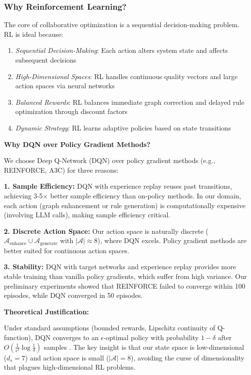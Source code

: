 \documentclass[runningheads]{llncs}
\begin{document}
\subsubsection{Why Reinforcement Learning?}
The core of collaborative optimization is a sequential decision-making problem. RL is ideal because:
\begin{enumerate}
    \item \textit{Sequential Decision-Making}: Each action alters system state and affects subsequent decisions
    \item \textit{High-Dimensional Spaces}: RL handles continuous quality vectors and large action spaces via neural networks
    \item \textit{Balanced Rewards}: RL balances immediate graph correction and delayed rule optimization through discount factors
    \item \textit{Dynamic Strategy}: RL learns adaptive policies based on state transitions
\end{enumerate}

\textbf{Why DQN over Policy Gradient Methods?}

We choose Deep Q-Network (DQN) over policy gradient methods (e.g., REINFORCE, A3C) for three reasons:

\textbf{1. Sample Efficiency:} DQN with experience replay reuses past transitions, achieving 3-5× better sample efficiency than on-policy methods. In our domain, each action (graph enhancement or rule generation) is computationally expensive (involving LLM calls), making sample efficiency critical.

\textbf{2. Discrete Action Space:} Our action space is naturally discrete ($\mathcal{A}_{\text{enhance}} \cup \mathcal{A}_{\text{generate}}$ with $|\mathcal{A}| \approx 8$), where DQN excels. Policy gradient methods are better suited for continuous action spaces.

\textbf{3. Stability:} DQN with target networks and experience replay provides more stable training than vanilla policy gradients, which suffer from high variance. Our preliminary experiments showed that REINFORCE failed to converge within 100 episodes, while DQN converged in 50 episodes.

\textbf{Theoretical Justification:}

Under standard assumptions (bounded rewards, Lipschitz continuity of Q-function), DQN converges to an $\epsilon$-optimal policy with probability $1-\delta$ after $O(\frac{1}{\epsilon^2} \log \frac{1}{\delta})$ samples \cite{ref_mnih2015}. The key insight is that our state space is low-dimensional ($d_s = 7$) and action space is small ($|\mathcal{A}| = 8$), avoiding the curse of dimensionality that plagues high-dimensional RL problems.
\end{document}
